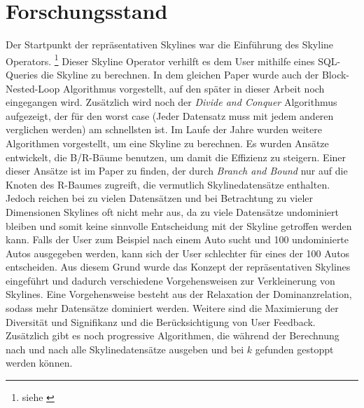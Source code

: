 \chapter{Forschungsstand}
\label{ch:Forschungsstand}
Der Startpunkt der repräsentativen Skylines war die Einführung des Skyline Operators. \footnote{siehe \cite{borzsony2001skyline}} Dieser Skyline Operator verhilft es dem User mithilfe eines SQL-Queries die Skyline zu berechnen. In dem gleichen Paper wurde auch der Block-Nested-Loop Algorithmus vorgestellt, auf den später in dieser Arbeit noch eingegangen wird. Zusätzlich wird noch der \textit{Divide and Conquer} Algorithmus aufgezeigt, der für den worst case (Jeder Datensatz muss mit jedem anderen verglichen werden) am schnellsten ist.  Im Laufe der Jahre wurden weitere Algorithmen vorgestellt, um eine Skyline zu berechnen. Es wurden Ansätze entwickelt, die B/R-Bäume benutzen, um damit die Effizienz zu steigern. Einer dieser Ansätze ist im Paper \cite{Papadias:2003:OPA:872757.872814} zu finden, der durch \textit{Branch and Bound} nur auf die Knoten des R-Baumes zugreift, die vermutlich Skylinedatensätze enthalten. 
Jedoch reichen bei zu vielen Datensätzen und bei Betrachtung zu vieler Dimensionen Skylines oft nicht mehr aus, da zu viele Datensätze undominiert bleiben und somit keine sinnvolle Entscheidung mit der Skyline getroffen werden kann. Falls der User zum Beispiel nach einem Auto sucht und 100 undominierte Autos ausgegeben werden, kann sich der User schlechter für eines der 100 Autos entscheiden.
Aus diesem Grund wurde das Konzept der repräsentativen Skylines eingeführt und dadurch verschiedene Vorgehensweisen zur Verkleinerung von Skylines. 
Eine Vorgehensweise besteht aus der Relaxation der Dominanzrelation, sodass mehr Datensätze dominiert werden. Weitere sind die Maximierung der Diversität und Signifikanz und die Berücksichtigung von User Feedback. Zusätzlich gibt es noch progressive Algorithmen, die während der Berechnung nach und nach alle Skylinedatensätze ausgeben und bei $k$ gefunden gestoppt werden können.
